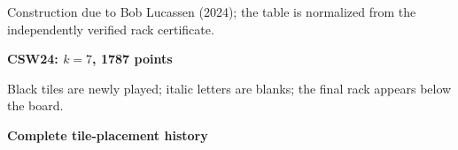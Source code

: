 \documentclass[letterpaper]{article}
\begin{document}
\vspace{-2pt}\begin{center}{\fontsize{8}{8.4}\selectfont Construction due to Bob Lucassen (2024); the table is normalized from the independently verified rack certificate.\par}\end{center}
\vfill
\clearpage
\begin{center}
{\fontsize{11}{12}\selectfont\bfseries CSW24: $k=7$, 1787 points\par}
\vspace{2pt}
\par
\vspace{1pt}
{\fontsize{7.2}{8}\selectfont Black tiles are newly played; italic letters are blanks; the final rack appears below the board.\par}
\vspace{2pt}
{\fontsize{8.5}{9}\selectfont\bfseries Complete tile-placement history\par}
\end{center}
\end{document}
